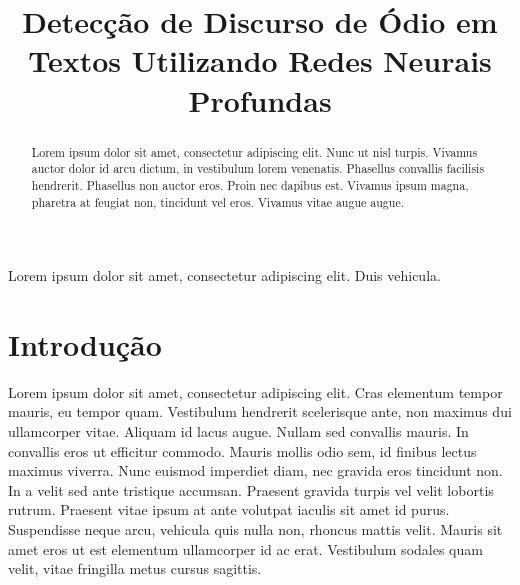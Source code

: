 \documentclass[conference]{IEEEtran}
\begin{document}
\title{Detecção de Discurso de Ódio em Textos Utilizando Redes Neurais Profundas}

\author{
\and
{}
\and
{}
}

\maketitle

\begin{abstract}
Lorem ipsum dolor sit amet, consectetur adipiscing elit. Nunc ut nisl turpis. Vivamus auctor dolor id arcu dictum, in vestibulum lorem venenatis. Phasellus convallis facilisis hendrerit. Phasellus non auctor eros. Proin nec dapibus est. Vivamus ipsum magna, pharetra at feugiat non, tincidunt vel eros. Vivamus vitae augue augue.
\end{abstract}

\begin{IEEEkeywords}
Lorem ipsum dolor sit amet, consectetur adipiscing elit. Duis vehicula.
\end{IEEEkeywords}

\section{Introdução}
Lorem ipsum dolor sit amet, consectetur adipiscing elit. Cras elementum tempor mauris, eu tempor quam. Vestibulum hendrerit scelerisque ante, non maximus dui ullamcorper vitae. Aliquam id lacus augue. Nullam sed convallis mauris. In convallis eros ut efficitur commodo. Mauris mollis odio sem, id finibus lectus maximus viverra. Nunc euismod imperdiet diam, nec gravida eros tincidunt non. In a velit sed ante tristique accumsan. Praesent gravida turpis vel velit lobortis rutrum. Praesent vitae ipsum at ante volutpat iaculis sit amet id purus. Suspendisse neque arcu, vehicula quis nulla non, rhoncus mattis velit. Mauris sit amet eros ut est elementum ullamcorper id ac erat. Vestibulum sodales quam velit, vitae fringilla metus cursus sagittis.
\end{document}
